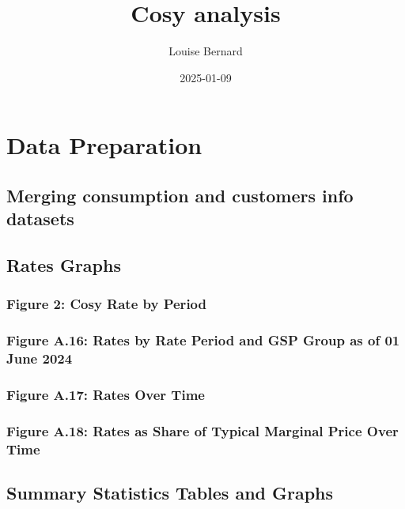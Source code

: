 \documentclass[
]{article}
\title{Cosy analysis}
\author{Louise Bernard}
\date{2025-01-09}
\begin{document}
\maketitle

{
\setcounter{tocdepth}{2}
\tableofcontents
}
\section{Data Preparation}\label{data-preparation}

\subsection{Merging consumption and customers info datasets}\label{merging-consumption-and-customers-info-datasets}

\subsection{Rates Graphs}\label{rates-graphs}

\subsubsection{Figure 2: Cosy Rate by Period}\label{figure-2-cosy-rate-by-period}

\subsubsection{Figure A.16: Rates by Rate Period and GSP Group as of 01 June 2024}\label{figure-a.16-rates-by-rate-period-and-gsp-group-as-of-01-june-2024}

\subsubsection{Figure A.17: Rates Over Time}\label{figure-a.17-rates-over-time}

\subsubsection{Figure A.18: Rates as Share of Typical Marginal Price Over Time}\label{figure-a.18-rates-as-share-of-typical-marginal-price-over-time}

\subsection{Summary Statistics Tables and Graphs}\label{sec:sumstats}
\end{document}
